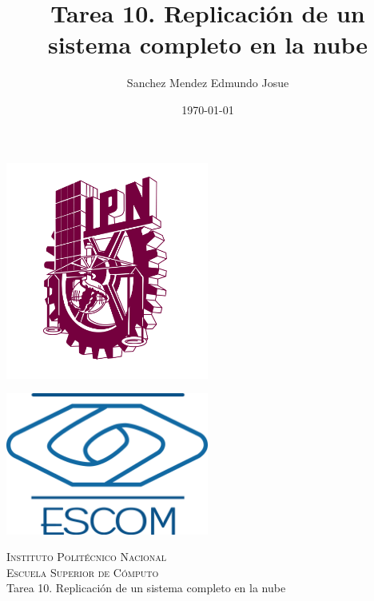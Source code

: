 \documentclass[11pt]{article}
\date{\today}
\title{Tarea 10. Replicación de un sistema completo en la nube}
\author{Sanchez Mendez Edmundo Josue}
\begin{document}
		\begin{titlepage}
			\begin{center}
				
				
				\noindent
				\begin{minipage}{0.5\textwidth}
					\begin{flushleft} \large
						\includegraphics[width=0.5\textwidth]{resources/ipn.png}
					\end{flushleft}
				\end{minipage}%
				\begin{minipage}{0.55\textwidth}
					\begin{flushright} \large
						\includegraphics[width=0.5\textwidth]{resources/escom.png}
					\end{flushright}
				\end{minipage}
				
				\textsc{\LARGE Instituto Politécnico Nacional}\\[0.5cm]
				
				\textsc{\Large Escuela Superior de Cómputo}\\[1cm]
				
				
				{ \huge Tarea 10. Replicación de un sistema completo en la nube \\[1cm] }
				

\end{center}
\end{titlepage}
\end{document}
